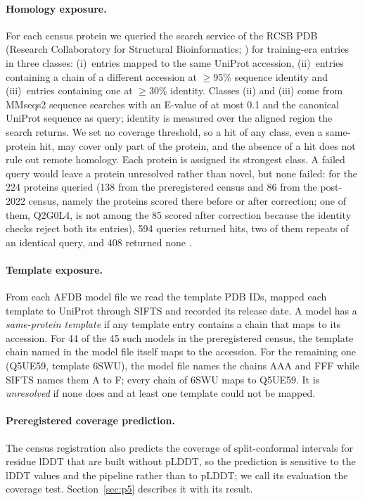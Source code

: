 \documentclass{article}
\begin{document}
\paragraph{Homology exposure.} For each census protein we queried the search
service of the RCSB PDB (Research Collaboratory for Structural
Bioinformatics; \citealp{burley2023}) for training-era entries in three
classes: (i)~entries mapped to the same UniProt accession, (ii)~entries containing a
chain of a different accession at $\ge$95\% sequence identity and
(iii)~entries containing one at $\ge$30\% identity. Classes (ii) and (iii)
come from MMseqs2 sequence searches \citep{steinegger2017} with an E-value of at most 0.1 and the canonical
UniProt sequence as query; identity is measured over the aligned region the search returns. We set no coverage threshold, so a hit of any class, even a same-protein hit, may cover only part of the protein, and the absence of a hit does not rule out remote homology. Each protein is
assigned its strongest class. A failed query would leave a protein
unresolved rather than novel, but none failed: for the 224 proteins queried
(138 from the preregistered census and 86 from the post-2022 census, namely the proteins scored there before or after correction; one of them, Q2G0L4, is not among the 85 scored after correction because the identity checks reject both its entries), 594
queries returned hits, two of them repeats of an identical query, and 408
returned none \citep{rcsbsearchapi}.

\paragraph{Template exposure.} From each AFDB model file we read the
template PDB IDs, mapped each template to UniProt through SIFTS and recorded
its release date. A model has a \emph{same-protein template} if any template entry contains a chain that maps to its accession. For 44 of the 45 such models in the preregistered census, the template chain named in the model file itself maps to the accession. For the remaining one (Q5UE59, template 6SWU), the model file names the chains AAA and FFF while SIFTS names them A to F; every chain of 6SWU maps to Q5UE59. It is \emph{unresolved} if none does and at least one
template could not be mapped.

\paragraph{Preregistered coverage prediction.} The census registration also
predicts the coverage of split-conformal intervals for residue lDDT that are
built without pLDDT, so the prediction is sensitive to the lDDT values and the pipeline rather than to pLDDT; we call its evaluation the coverage test. Section~\ref{sec:p5} describes it with its result.
\end{document}
